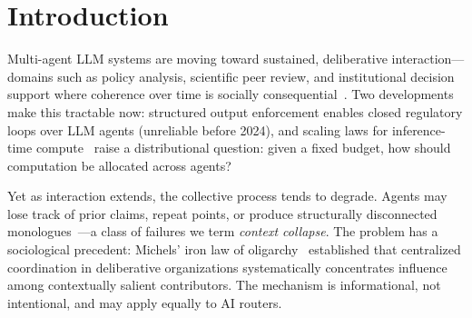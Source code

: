 \documentclass{llncs}
\begin{document}
\begin{abstract}
Los sistemas multi-agente LLM tienden a perder coherencia a medida que la
interacci\'on se extiende---un problema que denominamos \emph{colapso del
contexto}. Los frameworks existentes lo abordan mediante orquestaci\'on
est\'atica o heartbeats peri\'odicos, tratando la frecuencia de
participaci\'on como una constante de dise\~no. Presentamos LangClaw, un
framework donde cada agente mantiene un d\'eficit epist\'emico interno
$\delta_i \in [\varepsilon,\infty)$ gobernado por $D(\delta)=(\delta-\varepsilon)^2$;
la recompensa es reducci\'on de impulso $r_t = D(\delta_t)-D(\delta_{t+1})$
(teorema de Keramati y Gutkin, 2014). Un evaluador multicriterio act\'ua
como sensor; un Q-learner con pol\'itica $\varepsilon$-greedy selecciona
acciones via TD(0). Evaluamos LangClaw contra un enrutador al estilo LangGraph
en un debate pol\'itico con diez agentes GPT-5-nano organizados como dos
facciones VSM, midiendo coherencia argumentativa mediante m\'etricas AAF,
PRR$_G$ y $\Delta\varphi^*$.

\end{abstract}

\vspace{0.5cm}
\setcounter{page}{1}

\section{Introduction}
\label{sec:intro}

Multi-agent LLM systems are moving toward sustained, deliberative
interaction---domains such as policy analysis, scientific peer review, and
institutional decision support where coherence over time is socially
consequential~\parencite{wang2024survey}. Two developments make this tractable
now: structured output enforcement enables closed regulatory loops over LLM
agents (unreliable before 2024), and scaling laws for inference-time
compute~\parencite{snell2024scaling} raise a distributional question: given a
fixed budget, how should computation be allocated across agents?

Yet as interaction extends, the collective process tends to degrade. Agents
may lose track of prior claims, repeat points, or produce structurally
disconnected monologues~\parencite{park2023generative}---a class of failures
we term \emph{context collapse}. The problem has a sociological precedent:
Michels' iron law of oligarchy~\parencite{michels1911political} established
that centralized coordination in deliberative organizations systematically
concentrates influence among contextually salient contributors. The mechanism
is informational, not intentional, and may apply equally to AI routers.
\end{document}
